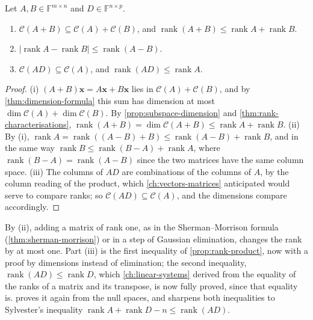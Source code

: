 \begin{proposition}
\label{prop:rank-sum}
Let $A,B\in\mathbb F^{m\times n}$ and $D\in\mathbb F^{n\times p}$.
\begin{enumerate}
\item $\mathcal C(A+B)\subseteq\mathcal C(A)+\mathcal C(B)$, and $\operatorname{rank}(A+B)\le\operatorname{rank}A+\operatorname{rank}B$.
\item $|\operatorname{rank}A-\operatorname{rank}B|\le\operatorname{rank}(A-B)$.
\item $\mathcal C(AD)\subseteq\mathcal C(A)$, and $\operatorname{rank}(AD)\le\operatorname{rank}A$.
\end{enumerate}
\end{proposition}

\begin{proof}
(i) $(A+B)\mathbf x=A\mathbf x+B\mathbf x$ lies in $\mathcal C(A)+\mathcal C(B)$, and by \cref{thm:dimension-formula} this sum has dimension at most $\dim\mathcal C(A)+\dim\mathcal C(B)$. By \cref{prop:subspace-dimension} and \cref{thm:rank-characterisations}, $\operatorname{rank}(A+B)=\dim\mathcal C(A+B)\le\operatorname{rank}A+\operatorname{rank}B$. (ii) By (i), $\operatorname{rank}A=\operatorname{rank}((A-B)+B)\le\operatorname{rank}(A-B)+\operatorname{rank}B$, and in the same way $\operatorname{rank}B\le\operatorname{rank}(B-A)+\operatorname{rank}A$, where $\operatorname{rank}(B-A)=\operatorname{rank}(A-B)$ since the two matrices have the same column space. (iii) The columns of $AD$ are combinations of the columns of $A$, by the column reading of the product, which \cref{ch:vectors-matrices} anticipated would serve to compare ranks; so $\mathcal C(AD)\subseteq\mathcal C(A)$, and the dimensions compare accordingly.
\end{proof}

By (ii), adding a matrix of rank one, as in the Sherman--Morrison formula (\cref{thm:sherman-morrison}) or in a step of Gaussian elimination, changes the rank by at most one. Part (iii) is the first inequality of \cref{prop:rank-product}, now with a proof by dimensions instead of elimination; the second inequality, $\operatorname{rank}(AD)\le\operatorname{rank}D$, which \cref{ch:linear-systems} derived from the equality of the ranks of a matrix and its transpose, is now fully proved, since that equality is.  proves it again from the null spaces, and sharpens both inequalities to Sylvester's inequality $\operatorname{rank}A+\operatorname{rank}D-n\le\operatorname{rank}(AD)$.

